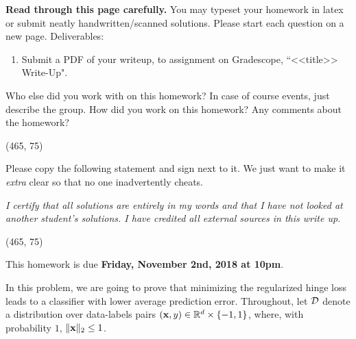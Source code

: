 \documentclass[preview]{standalone}
\begin{document}
\fontsize{12}{15}\selectfont


\textbf{Read through this page carefully.} You may typeset your homework in latex or submit neatly handwritten/scanned solutions. Please start each question on a new page. Deliverables:

\begin{enumerate}
  \item Submit a PDF of your writeup, 
  to assignment on Gradescope, ``<<title>> Write-Up". 
\end{enumerate}


\begin{Parts}

\Part Who else did you work with on this homework? In case of course events, just describe the group. How did you work on this homework? Any comments about the homework?

\vspace{15pt}
\framebox(465, 75){}

\Part Please copy the following statement and sign next to it. We just want to make it \textit{extra} clear so that no one inadvertently cheats.

\textit{I certify that all solutions are entirely in my words and that I have not looked at another student's solutions. I have credited all external sources in this write up.}

\vspace{15pt}
\framebox(465, 75){}

\end{Parts}

\pagebreak

This homework is due \textbf{Friday, November 2nd, 2018 at 10pm}.

%
\newcommand{\hinge}{\mathrm{hinge}}
\newcommand{\what}{\widehat{\w}}
\newcommand{\risk}{\mathcal{R}}
\newcommand{\calS}{\mathcal{S}}
In this problem, we are going to prove that minimizing the regularized hinge loss leads to a classifier with lower average prediction error. Throughout, let $\mathcal{D}$ denote a distribution over data-labels pairs $(\boldsymbol{\mathbf{x}},y) \in \mathbb{R}^d \times \{-1,1\}$, where, with probability $1$, $\|\boldsymbol{\mathbf{x}}\|_2 \le 1$.
\end{document}
